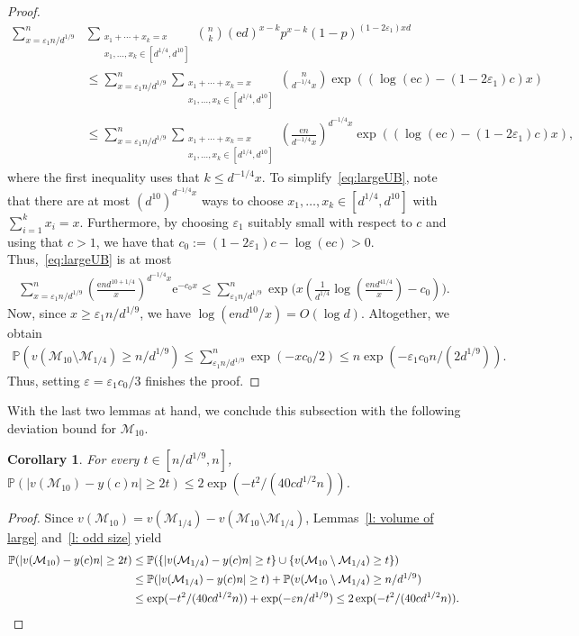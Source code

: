 \documentclass[reqno,final,a4paper]{amsart}
\newtheorem{corollary}[thm]{Corollary}
\theoremstyle{definition}
\newcommand{\cM}{\mathcal{M}}
\def\e{\mathrm{e}}
\def\eps{\varepsilon}
\newcommand{\1}{\mathbbm{1}}
\begin{document}
\begin{proof}
\begin{align}  
\sum_{x=\eps_1n/d^{1/9}}^n&\sum_{\substack{x_1+\cdots+x_k=x\\x_1,\ldots,x_k\in[d^{1/4},d^{10}]}}\binom{n}{k}(\e d)^{x-k}p^{x-k}(1-p)^{(1-2\eps_1)xd}\nonumber\\
    &\le \sum_{x=\eps_1n/d^{1/9}}^n\sum_{\substack{x_1+\cdots+x_k=x\\x_1,\ldots,x_k\in[d^{1/4},d^{10}]}}\binom{n}{d^{-1/4}x}\exp((\log\left(\e c\right)-(1-2\eps_1)c)x)\nonumber\\
    &\le \sum_{x=\eps_1n/d^{1/9}}^n\sum_{\substack{x_1+\cdots+x_k=x\\x_1,\ldots,x_k\in[d^{1/4},d^{10}]}}\left(\frac{\e n}{d^{-1/4}x}\right)^{d^{-1/4}x}\exp((\log\left(\e c\right)-(1-2\eps_1)c)x),\label{eq:largeUB}
\end{align}
where the first inequality uses that $k\le d^{-1/4}x$. To simplify~\eqref{eq:largeUB}, note that there are at most $(d^{10})^{d^{-1/4}x}$ ways to choose $x_1,\ldots, x_k\in[d^{1/4},d^{10}]$ with $\sum_{i=1}^{k}x_i=x$.
Furthermore, by choosing $\eps_1$ suitably small with respect to $c$ and using that $c>1$, we have that $c_0 := (1-2\eps_1)c - \log(\e c) > 0$.
Thus,~\eqref{eq:largeUB} is at most
\begin{align*}
\sum_{x=\eps_1 n/d^{1/9}}^n\left(\frac{\e nd^{10+1/4}}{x}\right)^{d^{-1/4}x}\e^{-c_0x}\le \sum_{\eps_1n/d^{1/9}}^n\exp\bigg(x\left(\frac{1}{d^{1/4}}\log\left(\frac{\e nd^{41/4}}{x}\right)-c_0\right)\bigg).
\end{align*}
Now, since $x\ge\eps_1n/d^{1/9}$, we have $\log(\e nd^{10}/x)=O(\log d)$. Altogether, we obtain
\begin{align*}
\mathbb P(v(\cM_{10}\setminus \cM_{1/4})\ge n/d^{1/9})\le  \sum_{\eps_1n/d^{1/9}}^n\exp(-xc_0/2)\le n\exp(-\eps_1c_0n/(2d^{1/9})).
\end{align*}
Thus, setting $\eps = \eps_1 c_0/3$ finishes the proof.
\end{proof}

With the last two lemmas at hand, we conclude this subsection with the following deviation bound for $\cM_{10}$.

\begin{corollary}\label{l: W(p)}
For every $t\in [n/d^{1/9},n]$, $\mathbb{P}(|v(\cM_{10})-y(c)n|\ge 2t)\le 2\exp(-t^2/(40cd^{1/2}n))$.
\end{corollary}
\begin{proof}
Since $v(\cM_{10}) = v(\cM_{1/4})-v(\cM_{10}\setminus \cM_{1/4})$, Lemmas~\ref{l: volume of large} and~\ref{l: odd size} yield
\begin{align*}
\mathbb{P}(|v(\cM_{10})-y(c)n|\ge 2t)&\le \mathbb{P}(\{|v(\cM_{1/4})-y(c)n|\ge t\}\cup\{v(\cM_{10}\setminus \cM_{1/4})\ge t\})\\
&\le \mathbb{P}(|v(\cM_{1/4})-y(c)n|\ge t)+\mathbb{P}(v(\cM_{10}\setminus \cM_{1/4})\ge n/d^{1/9})\\
&\le \exp(-t^2/(40cd^{1/2}n))+\exp(-\eps n/d^{1/9})\le 2\exp(-t^2/(40cd^{1/2}n)).\qedhere
\end{align*}
\end{proof}
\end{document}
